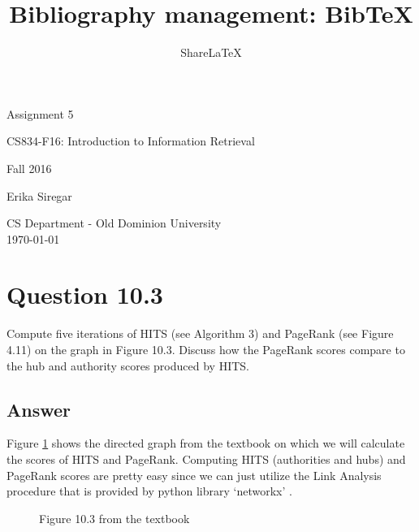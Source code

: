 \documentclass[letterpaper,11pt]{article}
\title{Bibliography management: BibTeX}
\author{Share\LaTeX}
\begin{document}
\begin{titlepage}

\begin{center}

\Huge{Assignment 5}

\Large{CS834-F16:  Introduction to Information Retrieval}

\Large{Fall 2016}


\Large{Erika Siregar}

\vfill

\Large{CS Department - Old Dominion University  \\ \today}


\end{center}

\end{titlepage}


\section*{Question 10.3}
\begin{spverbatim}
Compute five iterations of HITS (see Algorithm 3) and PageRank (see Figure 4.11) on the graph in Figure 10.3. Discuss how the PageRank scores compare to the hub and authority scores produced by HITS.
\end{spverbatim}

\subsection*{Answer}

Figure \ref{fig:10_3} shows the directed graph from the textbook \cite{Croft:2009:SEI:1516224} on which we will calculate the scores of HITS and PageRank. Computing HITS (authorities and hubs) and PageRank scores are pretty easy since we can just utilize the Link Analysis procedure that is provided by python library `networkx' \cite{networkx-hits-pagerank}. 

\begin{figure}[H]
	\centering
	\caption{Figure 10.3 from the textbook \cite{Croft:2009:SEI:1516224}}
	\label{fig:10_3}
\end{figure}
\end{document}
